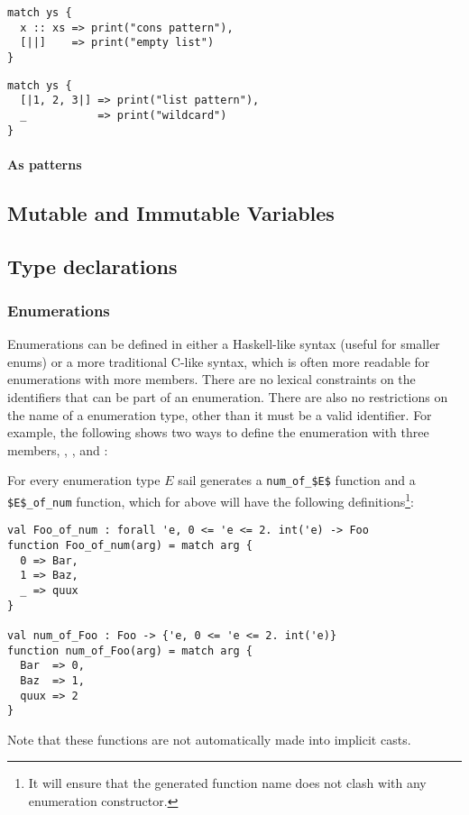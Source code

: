 \begin{lstlisting}
match ys {
  x :: xs => print("cons pattern"),
  [||]    => print("empty list")
}
\end{lstlisting}

\begin{lstlisting}
match ys {
  [|1, 2, 3|] => print("list pattern"),
  _           => print("wildcard")
}
\end{lstlisting}

\paragraph{As patterns}

\subsection{Mutable and Immutable Variables}

\subsection{Type declarations}

\subsubsection{Enumerations}

Enumerations can be defined in either a Haskell-like syntax
(useful for smaller enums) or a more traditional C-like syntax, which
is often more readable for enumerations with more members. There are
no lexical constraints on the identifiers that can be part of an
enumeration. There are also no restrictions on the name of a
enumeration type, other than it must be a valid identifier. For
example, the following shows two ways to define the enumeration
 with three members, , , and :




For every enumeration type $E$ sail generates a
\lstinline[mathescape]{num_of_$E$} function and a
\lstinline[mathescape]{$E$_of_num} function, which for  above
will have the following definitions\footnote{It will ensure that the
  generated function name  does not clash with any enumeration
  constructor.}:
\begin{lstlisting}
val Foo_of_num : forall 'e, 0 <= 'e <= 2. int('e) -> Foo
function Foo_of_num(arg) = match arg {
  0 => Bar,
  1 => Baz,
  _ => quux
}

val num_of_Foo : Foo -> {'e, 0 <= 'e <= 2. int('e)}
function num_of_Foo(arg) = match arg {
  Bar  => 0,
  Baz  => 1,
  quux => 2
}
\end{lstlisting}
Note that these functions are not automatically made into implicit
casts.

